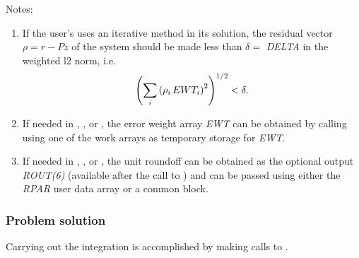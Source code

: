 \documentclass[letterpaper,10pt,english]{sphinxmanual}
\begin{document}
Notes:
\begin{enumerate}
\item {} 
If the user's {\hyperref[f_interface/Usage:f/_/FARKMASSPSOL]{\emph{}}} uses an iterative method in
its solution, the residual vector \(\rho = r - Pz\) of the
system should be made less than \(\delta =\) \emph{DELTA} in the
weighted l2 norm, i.e.
\begin{gather}
\begin{split}\left(\sum_i \left(\rho_i\, EWT_i\right)^2 \right)^{1/2} < \delta.\end{split}\notag
\end{gather}
\item {} 
If needed in {\hyperref[f_interface/Usage:f/_/FARKMTIMES]{\emph{}}}, {\hyperref[f_interface/Usage:f/_/FARKMASSPSOL]{\emph{}}}, or
{\hyperref[f_interface/Usage:f/_/FARKMASSPSET]{\emph{}}}, the error weight array \emph{EWT} can be
obtained by calling {\hyperref[f_interface/Optional_output:f/_/FARKGETERRWEIGHTS]{\emph{}}} using one of the
work arrays as temporary storage for \emph{EWT}.

\item {} 
If needed in {\hyperref[f_interface/Usage:f/_/FARKMTIMES]{\emph{}}}, {\hyperref[f_interface/Usage:f/_/FARKMASSPSOL]{\emph{}}}, or
{\hyperref[f_interface/Usage:f/_/FARKMASSPSET]{\emph{}}}, the unit roundoff can be obtained as the
optional output \emph{ROUT(6)} (available after the call to
{\hyperref[f_interface/Usage:f/_/FARKMALLOC]{\emph{}}}) and can be passed using either the \emph{RPAR}
user data array or a common block.

\end{enumerate}


\subsubsection{Problem solution}
\label{f_interface/Usage:finterface-solution}\label{f_interface/Usage:problem-solution}
Carrying out the integration is accomplished by making calls to
{\hyperref[f_interface/Usage:f/_/FARKODE]{\emph{}}}.
\end{document}
